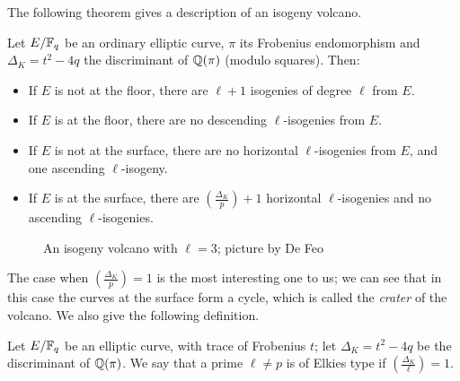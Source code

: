 The following theorem gives a description of an isogeny volcano.
\begin{theorem}
    Let $E/\mathbb{F}_q$ be an ordinary elliptic curve, $\pi$ its Frobenius endomorphism and $\Delta_K=t^2-4q$ the discriminant of $\mathbb{Q}(\pi)$ (modulo squares). Then:
    \begin{itemize}
        \item If $E$ is not at the floor, there are $\ell+1$ isogenies of degree $\ell$ from $E$.
        \item If $E$ is at the floor, there are no descending $\ell$-isogenies from $E$.
        \item If $E$ is not at the surface, there are no horizontal $\ell$-isogenies from $E$, and one ascending $\ell$-isogeny.
        \item If $E$ is at the surface, there are $\left( \frac{\Delta_K}{p} \right)+1$ horizontal $\ell$-isogenies and no ascending $\ell$-isogenies.
    \end{itemize}
\end{theorem}

\begin{figure}
    \centering
    \caption{An isogeny volcano with $\ell=3$; picture by De Feo}
    \label{picture_volcano}
\end{figure}

The case when $\left( \frac{\Delta_K}{p} \right)=1$ is the most interesting one to us; we can see that in this case the curves at the surface form a cycle, which is called the \emph{crater} of the volcano. We also give the following definition.
\begin{definition}
    Let $E/\mathbb{F}_q$ be an elliptic curve, with trace of Frobenius $t$; let $\Delta_K=t^2-4q$ be the discriminant of $\mathbb{Q}(\pi)$. We say that a prime $\ell\neq p$ is of Elkies type if $\left( \frac{\Delta_K}{\ell} \right)=1$.
\end{definition}

